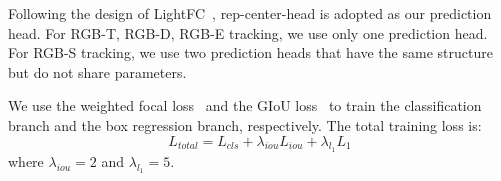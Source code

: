 Following the design of LightFC~\cite{lightfc}, rep-center-head is adopted as our prediction head. For RGB-T, RGB-D, RGB-E tracking, we use only one prediction head. For RGB-S tracking, we use two prediction heads that have the same structure but do not share parameters. 

We use the weighted focal loss~\cite{weightfocalloss} and the GIoU loss~\cite{giou} to train the classification branch and the box regression branch, respectively. The total training loss is:
\begin{equation}
    L_{total}=L_{cls}+\lambda_{iou}L_{iou}+\lambda_{l_{1}}L_{1}
\end{equation}
where $\lambda_{iou}=2$ and $\lambda_{l_{1}}=5$.
